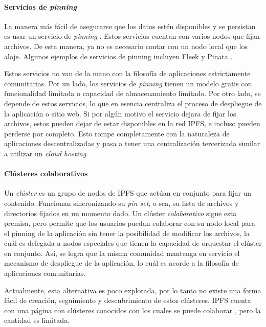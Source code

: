 \paragraph{Servicios de \textit{pinning}}

La manera más fácil de asegurarse que los datos estén disponibles y se persistan es usar un servicio de \textit{pinning} \cite{pinning-services}. Estos servicios cuentan con varios nodos que fijan archivos. De esta manera, ya no es necesario contar con un nodo local que los aloje. Algunos ejemplos de servicios de pinning incluyen Fleek \cite{fleek} y Pinata \cite{pinata}.

Estos servicios no van de la mano con la filosofía de aplicaciones estrictamente comunitarias. Por un lado, los servicios de \textit{pinning} tienen un modelo gratis con funcionalidad limitada o capacidad de almacenamiento limitado. Por otro lado, se depende de estos servicios, lo que en esencia centraliza el proceso de despliegue de la aplicación o sitio web. Si por algún motivo el servicio dejara de fijar los archivos, estos pueden dejar de estar disponibles en la red IPFS, e incluso pueden perderse por completo. Esto rompe completamente con la naturaleza de aplicaciones descentralizadas y pasa a tener una centralización tercerizada similar a utilizar un \textit{cloud hosting}.

\paragraph{Clústeres colaborativos}

Un \textit{clúster} es un grupo de nodos de IPFS que actúan en conjunto para fijar un contenido. Funcionan sincronizando su \textit{pin set}, o sea, su lista de archivos y directorios fijados en un momento dado. Un clúster \textit{colaborativo} sigue esta premisa, pero permite que los usuarios puedan colaborar con su nodo local para el pinning de la aplicación sin tener la posibilidad de modificar los archivos, la cuál es delegada a nodos especiales que tienen la capacidad de orquestar el clúster en conjunto. Así, se logra que la misma comunidad mantenga en servicio el mecanismo de despliegue de la aplicación, lo cuál es acorde a la filosofía de aplicaciones comunitarias.

Actualmente, esta alternativa es poco explorada, por lo tanto no existe una forma fácil de creación, seguimiento y descubrimiento de estos clústeres. IPFS cuenta con una página con clústeres conocidos con los cuales se puede colaborar \cite{collaborative-clusters}, pero la cantidad es limitada.

